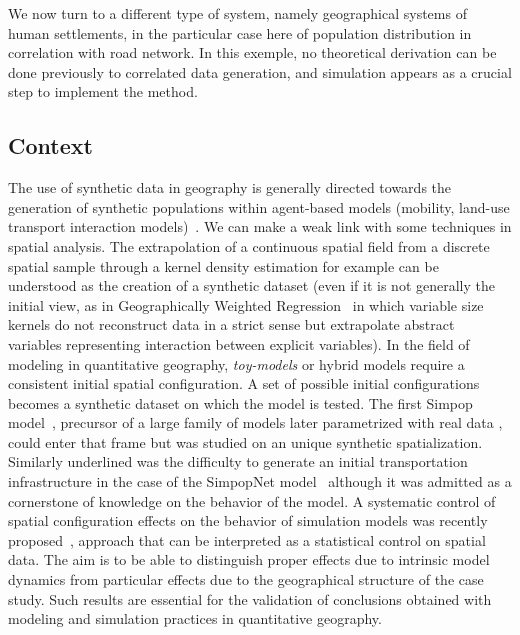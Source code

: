 \documentclass{bmcart}
\begin{document}
We now turn to a different type of system, namely geographical systems of human settlements, in the particular case here of population distribution in correlation with road network. In this exemple, no theoretical derivation can be done previously to correlated data generation, and simulation appears as a crucial step to implement the method.
 

\subsection*{Context}


The use of synthetic data in geography is generally directed towards the generation of synthetic populations within agent-based models (mobility, land-use transport interaction models)~\cite{pritchard2009advances}. We can make a weak link with some techniques in spatial analysis. The extrapolation of a continuous spatial field from a discrete spatial sample through a kernel density estimation for example can be understood as the creation of a synthetic dataset (even if it is not generally the initial view, as in Geographically Weighted Regression~\cite{brunsdon1998geographically} in which variable size kernels do not reconstruct data in a strict sense but extrapolate abstract variables representing interaction between explicit variables). In the field of modeling in quantitative geography, \emph{toy-models} or hybrid models require a consistent initial spatial configuration. A set of possible initial configurations becomes a synthetic dataset on which the model is tested. The first Simpop model~\cite{sanders1997simpop}, precursor of a large family of models later parametrized with real data \cite{pumain2012multi}, could enter that frame but was studied on an unique synthetic spatialization. Similarly underlined was the difficulty to generate an initial transportation infrastructure in the case of the SimpopNet model~\cite{schmitt2014modelisation} although it was admitted as a cornerstone of knowledge on the behavior of the model. A systematic control of spatial configuration effects on the behavior of simulation models was recently proposed~\cite{raimbault2018space}, approach that can be interpreted as a statistical control on spatial data. The aim is to be able to distinguish proper effects due to intrinsic model dynamics from particular effects due to the geographical structure of the case study. Such results are essential for the validation of conclusions obtained with modeling and simulation practices in quantitative geography.
\end{document}
